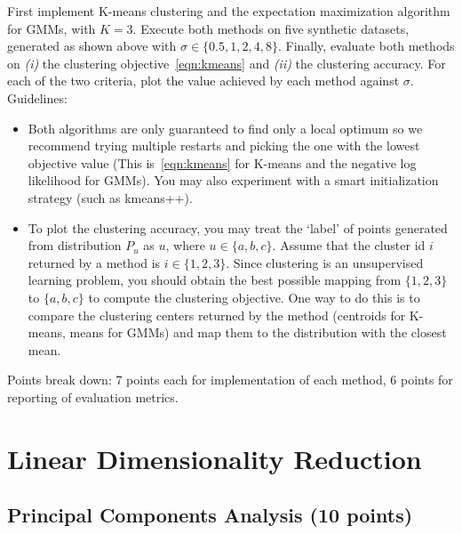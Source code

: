 \documentclass[letter]{article}
\newcounter{thm}
\theoremstyle{definition}
\begin{document}
First implement K-means clustering and the expectation maximization algorithm for GMMs, with $K=3$.
Execute both methods on five synthetic datasets,
generated as shown above with $\sigma \in \{0.5, 1, 2, 4, 8\}$. Finally, evaluate both methods on \emph{(i)} the clustering objective~\eqref{eqn:kmeans} and \emph{(ii)}  the clustering accuracy. For each of the two criteria, plot the value achieved by each method against $\sigma$.\\


Guidelines:
\begin{itemize} 
\item Both algorithms are only guaranteed to find only a local optimum so we recommend trying multiple
restarts and picking the one with the lowest objective value (This is~\eqref{eqn:kmeans} for K-means and the negative log likelihood for GMMs).
You may also experiment with a smart initialization
strategy (such as kmeans++).

\item
To plot the clustering accuracy,  you may treat the `label' of points generated from distribution
$P_u$ as $u$, where $u\in \{a, b, c\}$.
Assume that the cluster id $i$ returned by a method is $i\in \{1, 2, 3\}$.
Since clustering is an unsupervised learning problem, you should obtain the best possible mapping
from $\{1, 2, 3\}$ to $\{a, b, c\}$ to compute the clustering objective.
One way to do this is to compare the clustering centers returned by the method (centroids for
K-means, means for GMMs) and map them to the distribution with the closest mean.

\end{itemize}

Points break down: 7 points each for implementation of each method, 6 points for reporting of
evaluation metrics.


\section{Linear Dimensionality Reduction}

\subsection{Principal Components Analysis  (10 points)}
\label{sec:pca}
\end{document}
